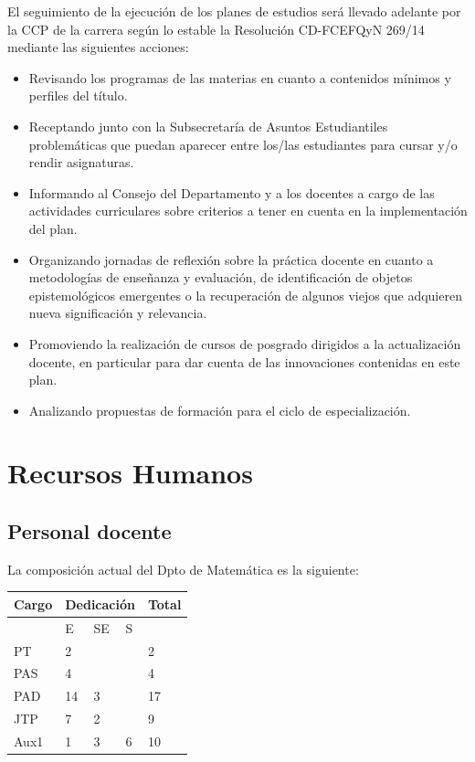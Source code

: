 \documentclass[a4paper, 12pt]{article}
\begin{document}
El seguimiento de la ejecución de los planes de estudios será llevado adelante por la CCP de la carrera según lo estable  la Resolución CD-FCEFQyN 269/14 mediante las siguientes acciones:

\begin{itemize}
 \item Revisando los programas de las materias en cuanto a contenidos mínimos y perfiles del título.
 \item Receptando junto con la Subsecretaría de Asuntos Estudiantiles problemáticas que puedan aparecer entre los/las estudiantes para cursar y/o rendir asignaturas.
 \item Informando al Consejo del Departamento y a los docentes a cargo de las actividades curriculares  sobre criterios a tener en cuenta en la implementación del plan.
 \item Organizando jornadas de reflexión sobre la práctica docente en cuanto a metodologías de enseñanza y evaluación, de identificación de objetos epistemológicos emergentes  o la recuperación de algunos viejos que adquieren nueva significación y relevancia.
 
 \item Promoviendo la realización de cursos de posgrado dirigidos a la actualización docente, en particular para dar cuenta de las innovaciones contenidas en este plan.
 
 \item Analizando propuestas de formación para el ciclo de especialización.
 
\end{itemize}


\section{Recursos Humanos}


\subsection{Personal docente}

La composición actual del Dpto de Matemática es la siguiente:
\begin{tabularx}{1\textwidth}{|l|l|l|l|l|} \hline  
 \rowcolor[gray]{.9}
 Cargo &\multicolumn{3}{|l|}{Dedicación} & Total\\ \hline
 \rowcolor[gray]{.9}
    &  E  &  SE  &  S &    \\ \hline  
PT & 2 & & & 2\\ \hline  
PAS & 4 & & & 4 \\ \hline
PAD & 14 & 3 & & 17 \\ \hline  
JTP & 7 & 2 & & 9\\ \hline  
Aux1 & 1 & 3 & 6 & 10 \\ \hline  
\end{tabularx}
\end{document}
